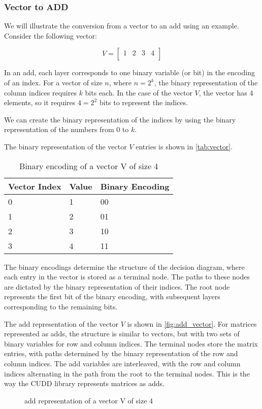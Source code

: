 \subsubsection{Vector to ADD}
We will illustrate the conversion from a vector to an \gls{add} using an example.
Consider the following vector:

\[
    V=
    \begin{bmatrix}
        1 & 2 & 3 & 4 \\
    \end{bmatrix}
\]

In an \gls{add}, each layer corresponds to one binary variable (or bit) in the encoding of an index. 
For a vector of size $n$, where $n = 2^k$, the binary representation of the column indices requires $k$ bits each. 
In the case of the vector $V$, the vector has 4 elements, so it requires $4 = 2^2$ bits to represent the indices.

We can create the binary representation of the indices by using the binary representation of the numbers from 0 to $k$.

The binary representation of the vector $V$ entries is shown in \autoref{tab:vector}.
\begin{table}
    \centering
    \caption{Binary encoding of a vector V of size 4}
    \label{tab:vector}
    \begin{tabular}{lll}
        \toprule
        Vector Index & Value & Binary Encoding \\
        \midrule
        0            & 1     & 00            \\
        1            & 2     & 01            \\
        2            & 3     & 10            \\
        3            & 4     & 11            \\
        \bottomrule
    \end{tabular}
\end{table}

The binary encodings determine the structure of the decision diagram, where each entry in the vector is stored as a terminal node.
The paths to these nodes are dictated by the binary representation of their indices.
The root node represents the first bit of the binary encoding, with subsequent layers corresponding to the remaining bits.

The \gls{add} representation of the vector $V$ is shown in \autoref{fig:add_vector}.
For matrices represented as \glspl{add}, the structure is similar to vectors, but with two sets of binary variables for row and column indices.
The terminal nodes store the matrix entries, with paths determined by the binary representation of the row and column indices.
The \gls{add} variables are interleaved, with the row and column indices alternating in the path from the root to the terminal nodes.
This is the way the CUDD library represents matrices as \glspl{add}.
\begin{figure}
    \centering
    
    \caption{\gls{add} representation of a vector V of size 4}
    \label{fig:add_vector}
\end{figure}

